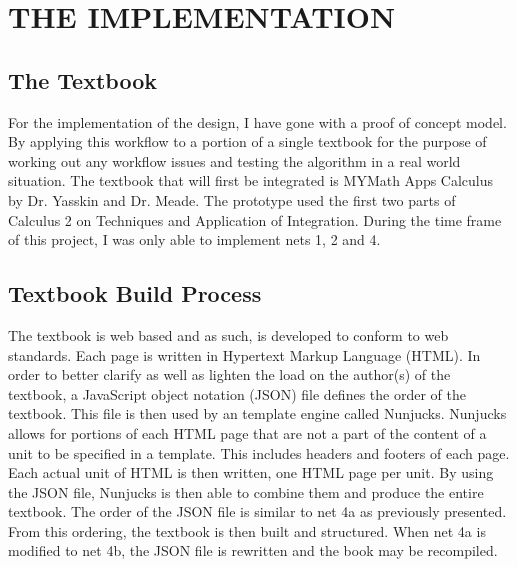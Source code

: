 %
%
%
%

\chapter{THE IMPLEMENTATION}

\section{The Textbook}

For the implementation of the design, I have gone with a proof of concept model. By applying this workflow to a portion of a single textbook for the purpose of working out any workflow issues and testing the algorithm in a real world situation. The textbook that will first be integrated is MYMath Apps Calculus by Dr. Yasskin and Dr. Meade. The prototype used the first two parts of Calculus 2 on Techniques and Application of Integration. During the time frame of this project, I was only able to implement nets 1, 2 and 4.

\section{Textbook Build Process}

The textbook is web based and as such, is developed to conform to web standards. Each page is written in Hypertext Markup Language (HTML). In order to better clarify as well as lighten the load on the author(s) of the textbook, a JavaScript object notation (JSON) file defines the order of the textbook. This file is then used by an template engine called Nunjucks. Nunjucks allows for portions of each HTML page that are not a part of the content of a unit to be specified in a template. This includes headers and footers of each page. Each actual unit of HTML is then written, one HTML page per unit. By using the JSON file, Nunjucks is then able to combine them and produce the entire textbook. The order of the JSON file is similar to net 4a as previously presented. From this ordering, the textbook is then built and structured. When net 4a is modified to net 4b, the JSON file is rewritten and the book may be recompiled. 


